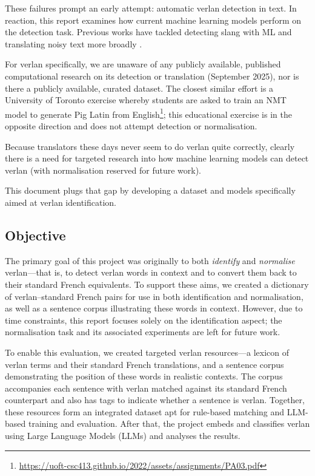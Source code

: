 \documentclass[12pt]{article}
\begin{document}
These failures prompt an early attempt: automatic verlan detection in text. In reaction, this report examines how current machine learning models perform on the detection task. Previous works have tackled detecting slang with ML and translating noisy text more broadly \cite{pei2019slang, michel2018mtnt}.

For verlan specifically, we are unaware of any publicly available, published computational research on its detection or translation (September 2025), nor is there a publicly available, curated dataset. The closest similar effort is a University of Toronto exercise whereby students are asked to train an NMT model to generate Pig Latin from English\footnote{\url{https://uoft-csc413.github.io/2022/assets/assignments/PA03.pdf}}; this educational exercise is in the opposite direction and does not attempt detection or normalisation.

Because translators these days never seem to do verlan quite correctly, clearly there is a need for targeted research into how machine learning models can detect verlan (with normalisation reserved for future work).

This document plugs that gap by developing a dataset and models specifically aimed at verlan identification.

\subsection{Objective}

The primary goal of this project was originally to both \textit{identify} and \textit{normalise} verlan\;---\;that is, to detect verlan words in context and to convert them back to their standard French equivalents. To support these aims, we created a dictionary of verlan--standard French pairs for use in both identification and normalisation, as well as a sentence corpus illustrating these words in context. However, due to time constraints, this report focuses solely on the identification aspect; the normalisation task and its associated experiments are left for future work.

To enable this evaluation, we created targeted verlan resources\;---\;a lexicon of verlan terms and their standard French translations, and a sentence corpus demonstrating the position of these words in realistic contexts. The corpus accompanies each sentence with verlan matched against its standard French counterpart and also has tags to indicate whether a sentence is verlan. Together, these resources form an integrated dataset apt for rule-based matching and LLM-based training and evaluation. After that, the project embeds and classifies verlan using Large Language Models (LLMs) and analyses the results.
\end{document}
